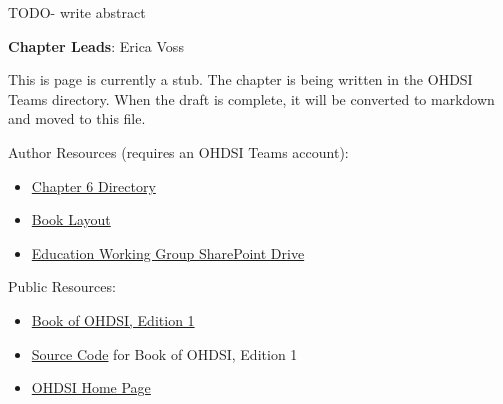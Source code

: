 \documentclass[
  letterpaper,
  paper=7in:10in,
  pagesize=pdftex,
  headinclude=on,
  footinclude=on,
  12pt]{scrbook}
\providecommand{\tightlist}{%
  \setlength{\itemsep}{0pt}\setlength{\parskip}{0pt}}\usepackage{longtable,booktabs,array}
\begin{document}
TODO- write abstract

\hfill\break

\textbf{Chapter Leads}: Erica Voss

\begin{tcolorbox}[enhanced jigsaw, opacitybacktitle=0.6, coltitle=black, colback=white, bottomrule=.15mm, bottomtitle=1mm, title=\textcolor{quarto-callout-note-color}{\faInfo}\hspace{0.5em}{Note}, titlerule=0mm, rightrule=.15mm, colbacktitle=quarto-callout-note-color!10!white, colframe=quarto-callout-note-color-frame, toptitle=1mm, arc=.35mm, left=2mm, breakable, opacityback=0, leftrule=.75mm, toprule=.15mm]

This is page is currently a stub. The chapter is being written in the
OHDSI Teams directory. When the draft is complete, it will be converted
to markdown and moved to this file.

Author Resources (requires an OHDSI Teams account):

\begin{itemize}
\tightlist
\item
  \href{https://ohdsiorg.sharepoint.com/sites/Workgroup-EducationWorkingGroup/Shared\%20Documents/Forms/AllItems.aspx?id=\%2Fsites\%2FWorkgroup\%2DEducationWorkingGroup\%2FShared\%20Documents\%2FSection\%20II\%20\%2D\%20Data\%2FChapter\%206\%20\%2D\%20Extract\%20Transform\%20Load&viewid=05fec2cc\%2Dec8a\%2D4d04\%2Db565\%2Dcf1289b96f67}{Chapter
  6 Directory}
\item
  \href{https://ohdsiorg.sharepoint.com/:x:/r/sites/Workgroup-EducationWorkingGroup/_layouts/15/Doc2.aspx?action=edit&sourcedoc=\%7B1fa31e39-1c5f-4918-b878-609ebd9810b3\%7D&wdOrigin=TEAMS-WEB.teamsSdk_ns.rwc&wdExp=TEAMS-TREATMENT&wdhostclicktime=1748104477731&web=1}{Book
  Layout}
\item
  \href{https://ohdsiorg.sharepoint.com/sites/Workgroup-EducationWorkingGroup/Shared\%20Documents/Forms/AllItems.aspx?viewid=05fec2cc\%2Dec8a\%2D4d04\%2Db565\%2Dcf1289b96f67}{Education
  Working Group SharePoint Drive}
\end{itemize}

Public Resources:

\begin{itemize}
\tightlist
\item
  \href{https://ohdsi.github.io/TheBookOfOhdsi/}{Book of OHDSI, Edition
  1}
\item
  \href{https://github.com/OHDSI/TheBookOfOhdsi}{Source Code} for Book
  of OHDSI, Edition 1
\item
  \href{https://ohdsi.org/}{OHDSI Home Page}
\end{itemize}

\end{tcolorbox}
\end{document}
